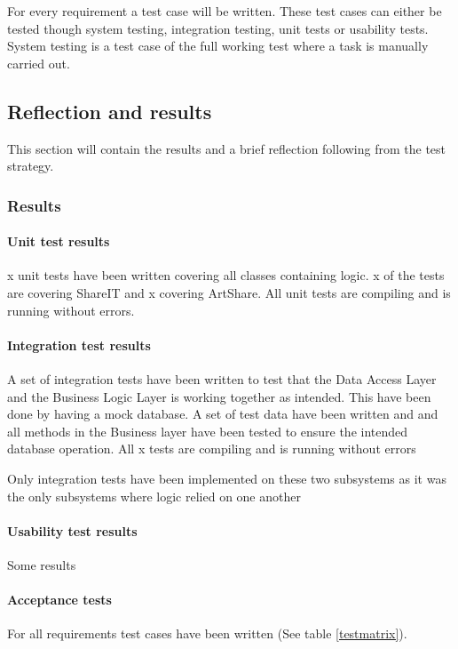 \documentclass[../report.tex]{subfiles}
\begin{document}
For every requirement a test case will be written. These test cases can either be tested though system testing, integration testing, unit tests or usability tests. System testing is a test case of the full working test where a task is manually carried out. 

\subsection{Reflection and results}
This section will contain the results and a brief reflection following from the test strategy.

\subsubsection{Results}
\paragraph{Unit test results}

x unit tests have been written covering all classes containing logic. x of the tests are covering ShareIT and x covering ArtShare. All unit tests are compiling and is running without errors.

\paragraph{Integration test results}

A set of integration tests have been written to test that the Data Access Layer and the Business Logic Layer is working together as intended. This have been done by having a mock database. A set of test data have been written and and all methods in the Business layer have been tested to ensure the intended database operation. All x tests are compiling and is running without errors

Only integration tests have been implemented on these two subsystems as it was the only subsystems where logic relied on one another

\paragraph{Usability test results}
Some results

\paragraph{Acceptance tests}
For all requirements test cases have been written (See table \ref{testmatrix}). 
\end{document}
